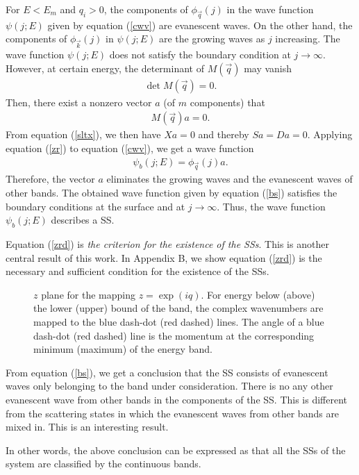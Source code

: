 \documentclass[aps,pra,amsmath,twocolumn,showpacs,bibnotes,10pt]{revtex4-1}
\begin{document}
For $E < E_m$ and $q_i > 0$, the components of $\phi_{\vec q}(j)$ in the wave function $\psi(j;E)$ given by equation (\ref{cwv}) are evanescent waves. On the other hand, the components of $\phi_{\vec k}(j)$ in $\psi(j;E)$ are the growing waves as $j$ increasing. The wave function $\psi(j;E)$ does not satisfy the boundary condition at $j \to \infty$.
However, at certain energy, the determinant of $M(\vec q)$ may vanish 
\begin{eqnarray}
\det M(\vec q) = 0. \label{zrd}
\end{eqnarray}
Then, there exist a nonzero vector $a$ (of $m$ components) that  
\begin{eqnarray}
M(\vec q)a = 0. \label{zr}
\end{eqnarray}
From equation (\ref{sltx}), we then have $Xa =0$ and thereby $Sa = Da = 0$. Applying equation (\ref{zr}) to equation (\ref{cwv}), we get a wave function 
\begin{eqnarray}
\psi_b(j;E) = \phi_{\vec q}(j)a. \label{bs}
\end{eqnarray}
Therefore, the vector $a$ eliminates the growing waves and the evanescent waves of other bands. The obtained wave function given by equation (\ref{bs}) satisfies the boundary conditions at the surface and at $j \to \infty$.  Thus, the wave function $\psi_b(j;E)$ describes a SS. 

Equation (\ref{zrd}) is {\it the criterion for the existence of the SSs}. This is another central result of this work. In Appendix B, we show equation (\ref{zrd}) is the necessary and sufficient condition for the existence of the SSs.

\begin{figure}[t]
\centerline{}
\caption{$z$ plane for the mapping $z = \exp(iq)$. For energy below (above) the lower (upper) bound of the band, the complex wavenumbers are mapped to the blue dash-dot (red dashed) lines. The angle of a blue dash-dot (red dashed) line is the momentum at the corresponding minimum (maximum) of the energy band.} 
\end{figure}

From equation (\ref{bs}), we get a conclusion that the SS consists of evanescent waves only belonging to the band under consideration. There is no any other evanescent wave from other bands in the components of the SS. This is different from the scattering states in which the evanescent waves from other bands are mixed in. This is an interesting result. 

In other words, the above conclusion can be expressed as that all the SSs of the system are classified by the continuous bands.
\end{document}
